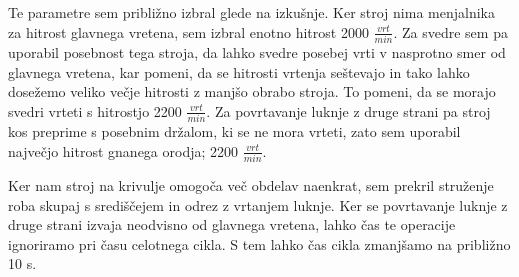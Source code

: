 Te parametre sem približno izbral glede na izkušnje. Ker stroj nima
menjalnika za hitrost glavnega vretena, sem izbral enotno hitrost
2000 \( \frac{vrt}{min} \). Za svedre sem pa uporabil posebnost tega stroja,
da lahko svedre posebej vrti v nasprotno smer od glavnega vretena, kar pomeni,
da se hitrosti vrtenja seštevajo in tako lahko dosežemo veliko večje hitrosti
z manjšo obrabo stroja. To pomeni, da se morajo svedri vrteti s hitrostjo
2200 \( \frac{vrt}{min} \). Za povrtavanje luknje z druge strani pa stroj
kos preprime s posebnim držalom, ki se ne mora vrteti, zato sem uporabil največjo
hitrost gnanega orodja; 2200 \( \frac{vrt}{min} \).

Ker nam stroj na krivulje omogoča več obdelav naenkrat, sem prekril
struženje roba skupaj s središčejem in odrez z vrtanjem luknje.
Ker se povrtavanje luknje z druge strani izvaja neodvisno od
glavnega vretena, lahko čas te operacije ignoriramo pri času
celotnega cikla.
S tem lahko čas cikla zmanjšamo na približno 10 s.
